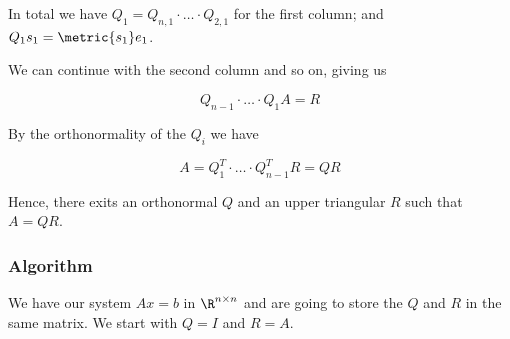 In total we have \(Q_1 = Q_{n,1} \cdot \dots \cdot Q_{2,1}\) for the first column; and 
\(Q_1 s_1 = \metric{s_1} e_1\).

We can continue with the second column and so on, giving us 

\[
    Q_{n-1}\cdot \dots \cdot Q_1 A = R
\]

By the orthonormality of the \(Q_i\) we have 

\[
    A = Q_1^T \cdot \dots \cdot Q_{n-1}^T R = Q R
\]

Hence, there exits an orthonormal \(Q\) and an upper triangular \(R\) such that \(A = QR\).

\QED

\subsubsection{Algorithm}

We have our system \(Ax = b\) in \(\R^{n \times n}\) and are going to store the \(Q\) and \(R\) in the same matrix. 
We start with \(Q = I\) and \(R = A\).

